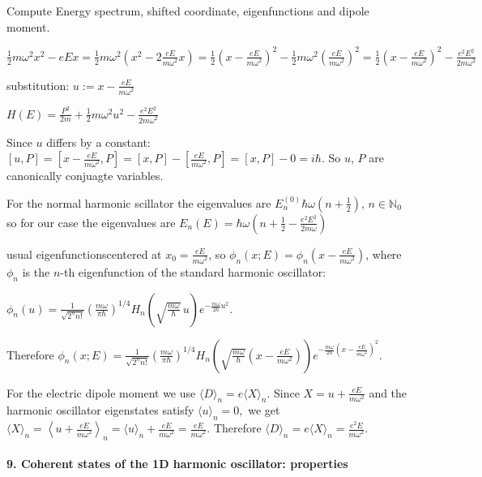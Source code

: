 \documentclass[11pt,a4paper]{scrartcl}
\begin{document}
\begin{calculationbox}
    Compute Energy spectrum, shifted coordinate, eigenfunctions and dipole moment.

    $\frac{1}{2}m\omega^2 x^2 - eEx = \frac{1}{2}m\omega^2 \left(x^2 - 2 \frac{eE}{m\omega^2}x\right) = \frac{1}{2} \left( x - \frac{eE}{m\omega^2}\right)^2 - \frac{1}{2}m\omega^2 \left( \frac{eE}{m\omega^2}\right)^2 =  \frac{1}{2} \left( x - \frac{eE}{m\omega^2}\right)^2 - \frac{e^2E^2}{2m\omega^2}$

    substitution: $u := x - \frac{eE}{m\omega^2}$

    $H(E) = \frac{P^2}{2m} + \frac{1}{2} m\omega^2 u^2 - \frac{e^2 E^2}{2 m \omega^2}$

    Since $u$ differs by a constant: $[u,P] = [x - \frac{eE}{m\omega^2}, P] = [x,P] - [\frac{eE}{m\omega^2},P] = [x,P] - 0 = i\hbar$. So $u$, $P$ are canonically conjuagte variables. 

    For the normal harmonic scillator the eigenvalues are $E_n^{(0)} \hbar \omega(n + \frac{1}{2})$, $n\in \mathbb{N}_0$ so for our case the eigenvalues are $E_n(E) = \hbar \omega (n + \frac{1}{2} - \frac{e^2E^2}{2m\omega})$

    usual eigenfunctionscentered at $x_0=\frac{eE}{m\omega^2}$, so $\phi_n(x;E)=\phi_n\!\left(x-\frac{eE}{m\omega^2}\right)$,  where $\phi_n$ is the $n$-th eigenfunction of the standard harmonic oscillator: 
    
    $\phi_n(u)=\frac{1}{\sqrt{2^n n!}}\left(\frac{m\omega}{\pi\hbar}\right)^{1/4}H_n\left(\sqrt{\frac{m\omega}{\hbar}}\,u\right)e^{-\frac{m\omega}{2\hbar}u^2}$.
    
    Therefore $\phi_n(x;E)=\frac{1}{\sqrt{2^n n!}}\left(\frac{m\omega}{\pi\hbar}\right)^{1/4}H_n\left(\sqrt{\frac{m\omega}{\hbar}}\left(x-\frac{eE}{m\omega^2}\right)\right) e^{-\frac{m\omega}{2\hbar}\left(x-\frac{eE}{m\omega^2}\right)^2}$.

        For the electric dipole moment we use
    $
    \langle D\rangle_n=e\langle X\rangle_n.
    $
    Since
    $
    X=u+\frac{eE}{m\omega^2}
    $
    and the harmonic oscillator eigenstates satisfy
    $
    \langle u\rangle_n=0,
    $
    we get
    $
    \langle X\rangle_n=\left\langle u+\frac{eE}{m\omega^2}\right\rangle_n
    =\langle u\rangle_n+\frac{eE}{m\omega^2}
    =\frac{eE}{m\omega^2}.
    $
    Therefore
    $
    \langle D\rangle_n=e\langle X\rangle_n=\frac{e^2E}{m\omega^2}.
    $
\end{calculationbox}

\paragraph{9. Coherent states of the 1D harmonic oscillator: properties}
\end{document}
